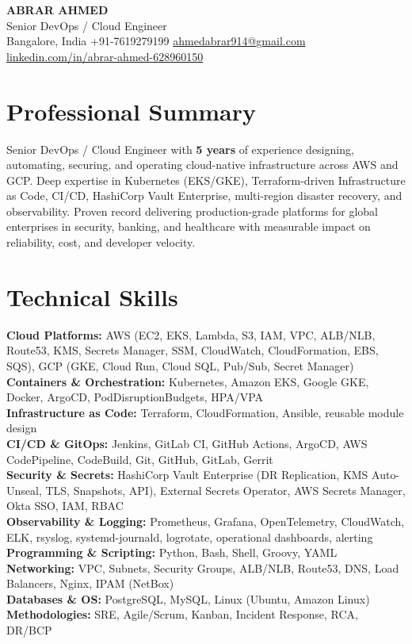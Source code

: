 \documentclass[letterpaper,10.5pt]{article}
\begin{document}
\begin{center}
    {\LARGE \textbf{ABRAR AHMED}}\\[2pt]
    {\normalsize Senior DevOps / Cloud Engineer}\\[2pt]
    Bangalore, India \textbar{} +91-7619279199 \textbar{}
    \href{mailto:ahmedabrar914@gmail.com}{ahmedabrar914@gmail.com} \textbar{}
    \href{https://linkedin.com/in/abrar-ahmed-628960150}{linkedin.com/in/abrar-ahmed-628960150}
\end{center}

\section*{Professional Summary}
Senior DevOps / Cloud Engineer with \textbf{5 years} of experience designing, automating, securing, and operating cloud-native infrastructure across AWS and GCP. Deep expertise in Kubernetes (EKS/GKE), Terraform-driven Infrastructure as Code, CI/CD, HashiCorp Vault Enterprise, multi-region disaster recovery, and observability. Proven record delivering production-grade platforms for global enterprises in security, banking, and healthcare with measurable impact on reliability, cost, and developer velocity.

\section*{Technical Skills}
\textbf{Cloud Platforms:} AWS (EC2, EKS, Lambda, S3, IAM, VPC, ALB/NLB, Route53, KMS, Secrets Manager, SSM, CloudWatch, CloudFormation, EBS, SQS), GCP (GKE, Cloud Run, Cloud SQL, Pub/Sub, Secret Manager)\\
\textbf{Containers \& Orchestration:} Kubernetes, Amazon EKS, Google GKE, Docker, ArgoCD, PodDisruptionBudgets, HPA/VPA\\
\textbf{Infrastructure as Code:} Terraform, CloudFormation, Ansible, reusable module design\\
\textbf{CI/CD \& GitOps:} Jenkins, GitLab CI, GitHub Actions, ArgoCD, AWS CodePipeline, CodeBuild, Git, GitHub, GitLab, Gerrit\\
\textbf{Security \& Secrets:} HashiCorp Vault Enterprise (DR Replication, KMS Auto-Unseal, TLS, Snapshots, API), External Secrets Operator, AWS Secrets Manager, Okta SSO, IAM, RBAC\\
\textbf{Observability \& Logging:} Prometheus, Grafana, OpenTelemetry, CloudWatch, ELK, rsyslog, systemd-journald, logrotate, operational dashboards, alerting\\
\textbf{Programming \& Scripting:} Python, Bash, Shell, Groovy, YAML\\
\textbf{Networking:} VPC, Subnets, Security Groups, ALB/NLB, Route53, DNS, Load Balancers, Nginx, IPAM (NetBox)\\
\textbf{Databases \& OS:} PostgreSQL, MySQL, Linux (Ubuntu, Amazon Linux)\\
\textbf{Methodologies:} SRE, Agile/Scrum, Kanban, Incident Response, RCA, DR/BCP
\end{document}
